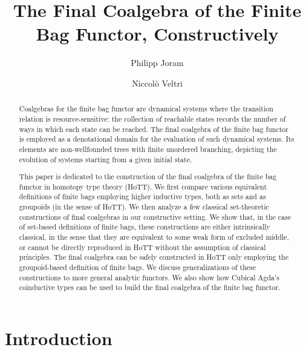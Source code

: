 \documentclass[runningheads]{llncs}
\begin{document}
\title{The Final Coalgebra of the Finite Bag Functor, Constructively}
\author{%
    Philipp Joram \and
    Niccolò Veltri%
}
%

\maketitle              %

\begin{abstract}

  Coalgebras for the finite bag functor are dynamical systems where the transition relation is resource-sensitive: the collection of reachable states records the number of ways in which each state can be reached. The final coalgebra of the finite bag functor is employed as a denotational domain for the evaluation of such dynamical systems. Its elements are non-wellfounded trees with finite unordered branching, depicting the evolution of systems starting from a given initial state.

  This paper is dedicated to the construction of the final coalgebra of the finite bag functor in homotopy type theory (HoTT). We first compare various equivalent definitions of finite bags employing higher inductive types, both as sets and as groupoids (in the sense of HoTT). We then analyze a few classical set-theoretic constructions of final coalgebras in our constructive setting. We show that, in the case of set-based definitions of finite bags, these constructions are either intrinsically classical, in the sense that they are equivalent to some weak form of excluded middle, or cannot be directly reproduced in HoTT without the assumption of classical principles. The final coalgebra can be safely constructed in HoTT only employing the groupoid-based definition of finite bags. We discuss generalizations of these constructions to more general analytic functors. We also show how Cubical Agda's coinductive types can be used to build the final coalgebra of the finite bag functor. 

\end{abstract}

\setcounter{tocdepth}{1}
\tableofcontents

\section{Introduction}
\end{document}
